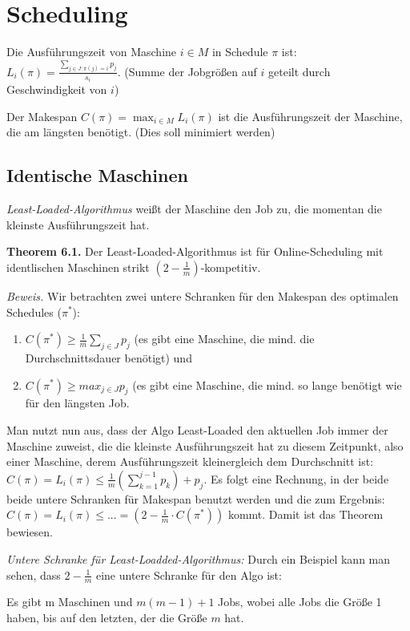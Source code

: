 \chapter{Scheduling}

Die Ausführungszeit von Maschine $i \in M$ in Schedule $\pi$ ist: $L_{i}(\pi) = \frac{\sum_{j \in J: \pi(j)=i} p_{j}}{s_{i}}$. (Summe der Jobgrößen auf $i$ geteilt durch Geschwindigkeit von $i$)

Der Makespan $C(\pi) = \max_{i \in M} L_{i}(\pi)$ ist die Ausführungszeit der Maschine, die am längsten benötigt. (Dies soll minimiert werden)

\section{Identische Maschinen}

\textit{Least-Loaded-Algorithmus} weißt der Maschine den Job zu, die momentan die kleinste Ausführungszeit hat.

\textbf{Theorem 6.1.} Der Least-Loaded-Algorithmus ist für Online-Scheduling mit identlischen Maschinen strikt $(2-\frac{1}{m})$-kompetitiv.

\textit{Beweis.} Wir betrachten zwei untere Schranken für den Makespan des optimalen Schedules ($\pi^{*}$):

\begin{enumerate}
\item $C(\pi^{*}) \ge \tfrac{1}{m} \sum_{j \in J} p_{j}$ (es gibt eine Maschine, die mind. die Durchschnittsdauer benötigt) und
\item $C(\pi^{*}) \ge max_{j \in J} p_{j}$ (es gibt eine Maschine, die mind. so lange benötigt wie für den längsten Job.
\end{enumerate}

Man nutzt nun aus, dass der Algo Least-Loaded den aktuellen Job immer der Maschine zuweist, die die kleinste Ausführungszeit hat zu diesem Zeitpunkt, also einer Maschine, derem Ausführungszeit kleinergleich dem Durchschnitt ist: $C(\pi) = L_{i}(\pi) \le \frac{1}{m} (\sum_{k=1}^{j-1}p_{k}) + p_{j}$. Es folgt eine Rechnung, in der beide beide untere Schranken für Makespan benutzt werden und die zum Ergebnis: $C(\pi) = L_{i}(\pi) \le ... = (2-\tfrac{1}{m} \cdot C(\pi^{*}))$ kommt. Damit ist das Theorem bewiesen.

\textit{Untere Schranke für Least-Loadded-Algorithmus:} Durch ein Beispiel kann man sehen, dass $2 - \tfrac{1}{m}$ eine untere Schranke für den Algo ist:

Es gibt m Maschinen und $m(m-1) + 1$ Jobs, wobei alle Jobs die Größe 1 haben, bis auf den letzten, der die Größe $m$ hat.

